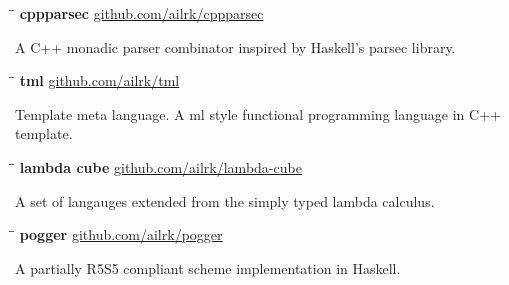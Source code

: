 \documentclass{res}
\begin{document}
\begin{resume}
    \vspace{-0.1in}
    \begin{tabbing}
        \hspace{2.4in}\= \hspace{0.9in}\= \kill
        {\bf cppparsec } \>               \>\url{github.com/ailrk/cppparsec}\\

    \end{tabbing}\vspace{-30pt}
    A C++ monadic parser combinator inspired by Haskell's parsec library.

    \vspace{-0.2in}
    \begin{tabbing}
        \hspace{2.4in}\= \hspace{0.9in}\= \kill
        {\bf tml} \>               \>\url{github.com/ailrk/tml}\\

    \end{tabbing}\vspace{-30pt}
    Template meta language. A ml style functional programming language in C++ template.

    \vspace{-0.2in}
    \begin{tabbing}
        \hspace{2.4in}\= \hspace{0.9in}\= \kill
        {\bf lambda cube} \>               \>\url{github.com/ailrk/lambda-cube}\\

    \end{tabbing}\vspace{-30pt}
    A set of langauges extended from the simply typed lambda calculus.

    \vspace{-0.2in}
    \begin{tabbing}
        \hspace{2.4in}\= \hspace{0.9in}\= \kill
        {\bf pogger } \>               \>\url{github.com/ailrk/pogger}\\

    \end{tabbing}\vspace{-30pt}
    A partially R5S5 compliant scheme implementation in Haskell.



\end{resume}
\end{document}
